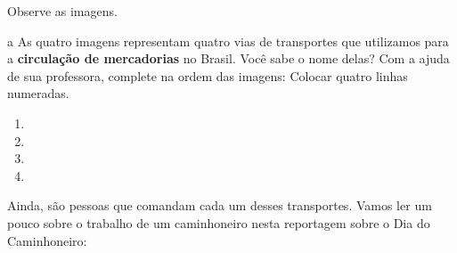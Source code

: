 Observe as imagens.






\num{a} As quatro imagens representam quatro vias de transportes que utilizamos
para a \textbf{circulação de mercadorias} no Brasil. Você sabe o nome
delas? Com a ajuda de sua professora, complete na ordem das imagens:
Colocar quatro linhas numeradas.

\begin{enumerate}
\item \preencher {}

\item \preencher {}

\item \preencher {}

\item \preencher {}

\end{enumerate}

Ainda, são pessoas que comandam cada um desses transportes. Vamos ler um
pouco sobre o trabalho de um caminhoneiro nesta reportagem sobre o Dia
do Caminhoneiro:

